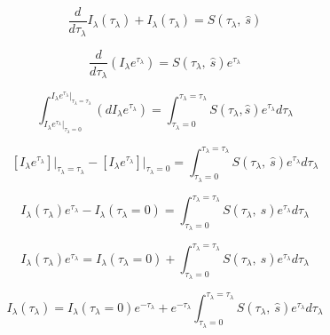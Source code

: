 \documentclass[12pt]{article}
\renewcommand{\_}{\kern-1.5pt\textunderscore\kern-1.5pt}
\begin{document}
 \[ \frac{d}{d \tau_{ \lambda }}I_{ \lambda } \left(  \tau_{ \lambda } \right) +I_{ \lambda } \left(  \tau_{ \lambda } \right) =S \left(  \tau_{ \lambda },~\hat{s} \right)  \] \par

\par

\par

 \[ \frac{d}{d \tau_{ \lambda }} \left( I_{ \lambda }e^{ \tau_{ \lambda }} \right) =S \left(  \tau_{ \lambda },~\hat{s} \right) e^{ \tau_{ \lambda }} \] \par

\[
\int_{I_{\lambda}e^{\tau_{\lambda}}\vert_{\tau_{\lambda}=0}}^{I_{\lambda}e^{\tau_{\lambda}}\vert_{\tau_{\lambda}=\tau_{\lambda}}}(dI_{\lambda}e^{\tau_{\lambda}})=\int_{\tau_{\lambda}=0}^{\tau_{\lambda}=\tau_{\lambda}}S(\tau_{\lambda},\hat{s})e^{\tau_{\lambda}}d\tau_{\lambda}
\] \par
 
 
 

 \[  \left[ I_{ \lambda }e^{ \tau_{ \lambda }} \right]\vert _{ \tau_{ \lambda }= \tau_{ \lambda }}- \left[ I_{ \lambda }e^{ \tau_{ \lambda }} \right]\vert _{ \tau_{ \lambda }=0}= \int _{ \tau_{ \lambda }=0}^{ \tau_{ \lambda }= \tau_{ \lambda }}S \left(  \tau_{ \lambda },~\hat{s} \right) e^{ \tau_{ \lambda }}d \tau_{ \lambda } \] \par

 \[ I_{ \lambda } \left(  \tau_{ \lambda } \right) e^{ \tau_{ \lambda }}-I_{ \lambda } \left(  \tau_{ \lambda }=0 \right) = \int _{ \tau_{ \lambda }=0}^{ \tau_{ \lambda }= \tau_{ \lambda }}S \left(  \tau_{ \lambda },~\hat{s} \right) e^{ \tau_{ \lambda }}d \tau_{ \lambda } \] \par

 \[ I_{ \lambda } \left(  \tau_{ \lambda } \right) e^{ \tau_{ \lambda }}=I_{ \lambda } \left(  \tau_{ \lambda }=0 \right) + \int _{ \tau_{ \lambda }=0}^{ \tau_{ \lambda }= \tau_{ \lambda }}S \left(  \tau_{ \lambda },~\hat{s} \right) e^{ \tau_{ \lambda }}d \tau_{ \lambda } \] \par

 \[ I_{ \lambda } \left(  \tau_{ \lambda } \right) =I_{ \lambda } \left(  \tau_{ \lambda }=0 \right) e^{- \tau_{ \lambda }}+e^{- \tau_{ \lambda }} \int _{ \tau_{ \lambda }=0}^{ \tau_{ \lambda }= \tau_{ \lambda }}S \left(  \tau_{ \lambda },~\hat{s} \right) e^{ \tau_{ \lambda }}d \tau_{ \lambda } \] \par
\end{document}
